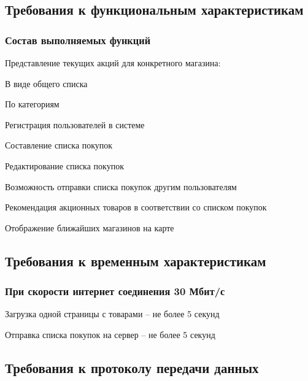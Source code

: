 \subsection{Требования к функциональным характеристикам}

\subsubsection{Состав выполняемых функций}
\begin{my_enumerate}
\item Представление текущих акций для конкретного магазина:
    \begin{my_enumerate}
    \item В виде общего списка
    \item По категориям
    \end{my_enumerate}
\item Регистрация пользователей в системе
\item Составление списка покупок
\item Редактирование списка покупок
\item Возможность отправки списка покупок другим пользователям
\item Рекомендация акционных товаров в соответствии со списком покупок
\item Отображение ближайших магазинов на карте
\end{my_enumerate}

\subsection{Требования к временным характеристикам}

\subsubsection{При скорости интернет соединения 30 Мбит/с}
\begin{my_enumerate}
\item Загрузка одной страницы с товарами -- не более 5 секунд
\item Отправка списка покупок на сервер -- не более 5 секунд
\end{my_enumerate}


\subsection{Требования к протоколу передачи данных}

